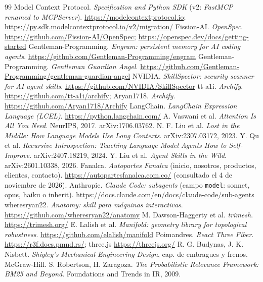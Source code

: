 \begin{thebibliography}{99}
 Model Context Protocol. \emph{Specification and Python SDK} (v2: \emph{FastMCP renamed to MCPServer}). \url{https://modelcontextprotocol.io}; \url{https://py.sdk.modelcontextprotocol.io/v2/migration/}
 Fission-AI. \emph{OpenSpec}. \url{https://github.com/Fission-AI/OpenSpec}; \url{https://openspec.dev/docs/getting-started}
 Gentleman-Programming. \emph{Engram: persistent memory for AI coding agents}. \url{https://github.com/Gentleman-Programming/engram}
 Gentleman-Programming. \emph{Gentleman Guardian Angel}. \url{https://github.com/Gentleman-Programming/gentleman-guardian-angel}
 NVIDIA. \emph{SkillSpector: security scanner for AI agent skills}. \url{https://github.com/NVIDIA/SkillSpector}
 tt-a1i. \emph{Archify}. \url{https://github.com/tt-a1i/archify}; Aryan1718. \emph{Archify}. \url{https://github.com/Aryan1718/Archify}
 LangChain. \emph{LangChain Expression Language (LCEL)}. \url{https://python.langchain.com/}
 A. Vaswani et al. \emph{Attention Is All You Need}. NeurIPS, 2017. arXiv:1706.03762.
 N. F. Liu et al. \emph{Lost in the Middle: How Language Models Use Long Contexts}. arXiv:2307.03172, 2023.
 Y. Qu et al. \emph{Recursive Introspection: Teaching Language Model Agents How to Self-Improve}. arXiv:2407.18219, 2024.
 Y. Liu et al. \emph{Agent Skills in the Wild}. arXiv:2601.10338, 2026.
 Fanalca. \emph{Autopartes Fanalca} (inicio, nosotros, productos, clientes, contacto). \url{https://autopartesfanalca.com.co/} (consultado el 4 de noviembre de 2026).
 Anthropic. \emph{Claude Code: subagents} (campo \texttt{model}: sonnet, opus, haiku o inherit). \url{https://docs.claude.com/en/docs/claude-code/sub-agents}
 wheresryan22. \emph{Anatomy: skill para máquinas interactivas}. \url{https://github.com/wheresryan22/anatomy}
 M. Dawson-Haggerty et al. \emph{trimesh}. \url{https://trimesh.org/}
 E. Lalish et al. \emph{Manifold: geometry library for topological robustness}. \url{https://github.com/elalish/manifold}
 Poimandres. \emph{React Three Fiber}. \url{https://r3f.docs.pmnd.rs/}; three.js \url{https://threejs.org/}
 R. G. Budynas, J. K. Nisbett. \emph{Shigley's Mechanical Engineering Design}, cap. de embragues y frenos. McGraw-Hill.
 S. Robertson, H. Zaragoza. \emph{The Probabilistic Relevance Framework: BM25 and Beyond}. Foundations and Trends in IR, 2009.
\end{thebibliography}
\endgroup

